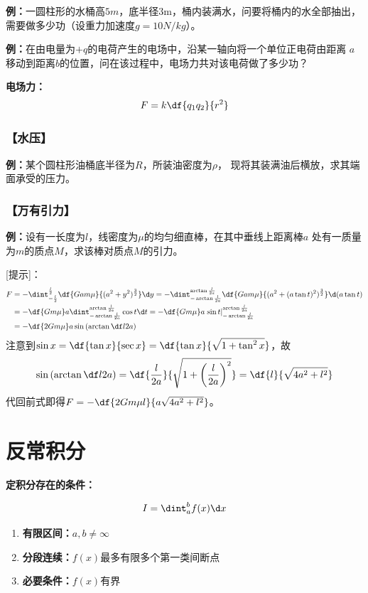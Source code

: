 {\bf 例：}一圆柱形的水桶高$5m$，底半径$3$m，桶内装满水，问要将桶内的水全部抽出，
需要做多少功（设重力加速度$g=10N/kg$）。

{\bf 例：}在由电量为$+q$的电荷产生的电场中，沿某一轴向将一个单位正电荷由距离
$a$移动到距离$b$的位置，问在该过程中，电场力共对该电荷做了多少功？

{\bf 电场力：}
$$F=k\df{q_1q_2}{r^2}$$

\subsubsection{【水压】}

{\bf 例：}某个圆柱形油桶底半径为$R$，所装油密度为$\rho$，
现将其装满油后横放，求其端面承受的压力。

\subsubsection{【万有引力】}

{\bf 例：}设有一长度为$l$，线密度为$\mu$的均匀细直棒，在其中垂线上距离棒$a$
处有一质量为$m$的质点$M$，求该棒对质点$M$的引力。

[提示]：
\begin{align}
	F&=-\dint_{-\frac l2}^{\frac l2}\df{Gam\mu}{(a^2+y^2)^{\frac32}}\d y
	=-\dint_{-\arctan\frac l{2a}}^{\arctan\frac l{2a}}\df{Gam\mu}{(a^2+(a\tan
	t)^2)^{\frac32}}\d (a\tan t)\notag\\
	&=-\df{Gm\mu}a\dint_{-\arctan\frac l{2a}}^{\arctan\frac
	l{2a}}\cos t\d t=-\df{Gm\mu}a\left.\sin t\right|_{-\arctan\frac
	l{2a}}^{\arctan\frac l{2a}}\notag\\
	&=-\df{2Gm\mu}a\sin\left(\arctan\df l{2a}\right)\notag
\end{align}
注意到$\sin x=\df{\tan x}{\sec x}=\df{\tan x}{\sqrt{1+\tan^2 x}}$，故
$$\sin\left(\arctan\df l{2a}\right)=\df{\frac{l}{2a}}
{\sqrt{1+\left(\frac{l}{2a}\right)^2}}=\df{l}{\sqrt{4a^2+l^2}}$$
代回前式即得$F=-\df{2Gm\mu l}{a\sqrt{4a^2+l^2}}$。

\section{反常积分}

{\bf 定积分存在的条件：}

$${I=\dint_a^bf(x)\d x}$$

\begin{enumerate} [(1)]
  \setlength{\itemindent}{1cm}
  \item {\bf 有限区间：}$a,b\ne \infty$
  \item {\bf 分段连续：}$f(x)$最多有限多个第一类间断点 
  \item {\bf 必要条件：}$f(x)$有界
\end{enumerate}

